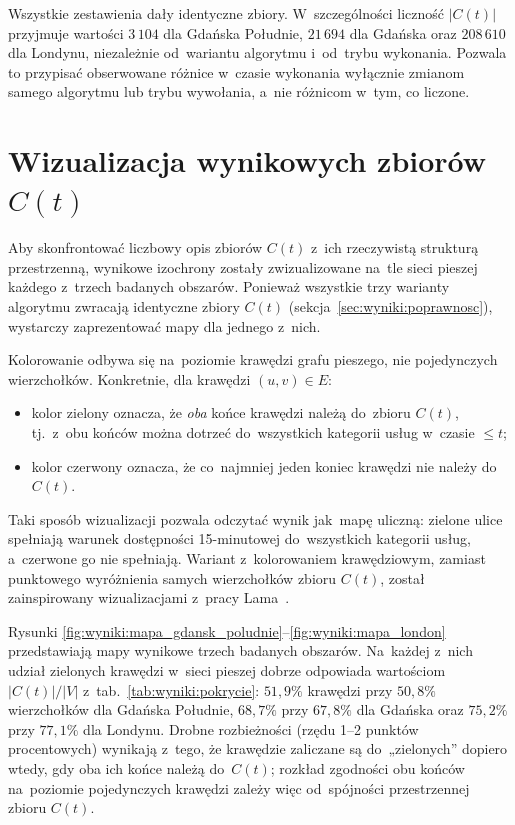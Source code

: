 Wszystkie zestawienia dały identyczne zbiory. W~szczególności
liczność $|C(t)|$ przyjmuje wartości $3\,104$ dla Gdańska Południe,
$21\,694$ dla Gdańska oraz $208\,610$ dla Londynu, niezależnie od~wariantu
algorytmu i~od~trybu wykonania. Pozwala to przypisać obserwowane różnice
w~czasie wykonania wyłącznie zmianom samego algorytmu lub trybu wywołania,
a~nie różnicom w~tym, co liczone.

\section{Wizualizacja wynikowych zbiorów $C(t)$}
\label{sec:wyniki:mapy}

Aby skonfrontować liczbowy opis zbiorów $C(t)$ z~ich rzeczywistą strukturą
przestrzenną, wynikowe izochrony zostały zwizualizowane na~tle sieci pieszej
każdego z~trzech badanych obszarów. Ponieważ wszystkie trzy warianty algorytmu
zwracają identyczne zbiory $C(t)$ (sekcja~\ref{sec:wyniki:poprawnosc}),
wystarczy zaprezentować mapy dla jednego z~nich.

Kolorowanie odbywa się na~poziomie krawędzi grafu pieszego, nie pojedynczych
wierzchołków. Konkretnie, dla krawędzi $(u,v)\in E$:
\begin{itemize}
  \item \textcolor[HTML]{2ca02c}{kolor zielony} oznacza, że \emph{oba}
        końce krawędzi należą do~zbioru $C(t)$, tj.\ z~obu końców można
        dotrzeć do~wszystkich kategorii usług w~czasie $\le t$;
  \item \textcolor[HTML]{d62728}{kolor czerwony} oznacza, że co~najmniej
        jeden koniec krawędzi nie należy do~$C(t)$.
\end{itemize}
Taki sposób wizualizacji pozwala odczytać wynik jak~mapę uliczną: zielone
ulice spełniają warunek dostępności 15-minutowej do~wszystkich kategorii
usług, a~czerwone go nie spełniają. Wariant z~kolorowaniem krawędziowym, zamiast
punktowego wyróżnienia samych wierzchołków zbioru $C(t)$, został zainspirowany
wizualizacjami z~pracy Lama~\cite{Lam2024}.

Rysunki \ref{fig:wyniki:mapa_gdansk_poludnie}--\ref{fig:wyniki:mapa_london}
przedstawiają mapy wynikowe trzech badanych obszarów. Na~każdej z~nich
udział zielonych krawędzi w~sieci pieszej dobrze odpowiada wartościom
$|C(t)|/|V|$ z~tab.~\ref{tab:wyniki:pokrycie}: $51{,}9\%$ krawędzi
przy $50{,}8\%$ wierzchołków dla Gdańska Południe, $68{,}7\%$ przy $67{,}8\%$
dla Gdańska oraz $75{,}2\%$ przy $77{,}1\%$ dla Londynu. Drobne rozbieżności
(rzędu 1--2 punktów procentowych) wynikają z~tego, że krawędzie zaliczane są
do~„zielonych” dopiero wtedy, gdy oba ich końce należą do~$C(t)$; rozkład
zgodności obu końców na~poziomie pojedynczych krawędzi zależy więc od~spójności
przestrzennej zbioru $C(t)$.

